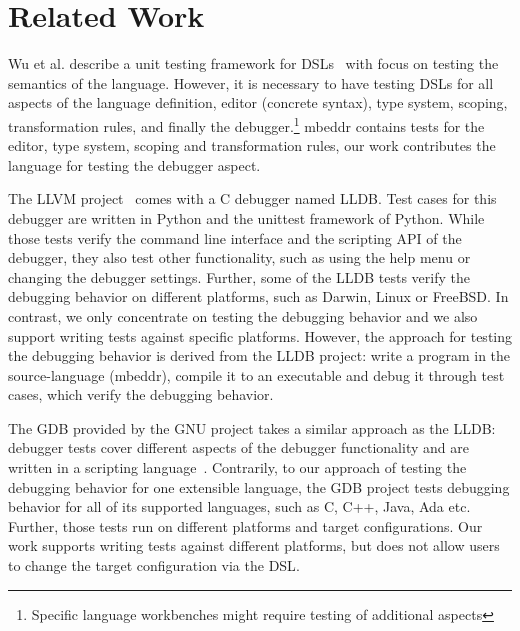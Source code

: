 \section{Related Work}

Wu et al. describe a unit testing framework for 
\acp{DSL}~\cite{DBLP:conf/dsl/WuGM09} with focus on
testing the semantics of the language.  However, it is necessary to have
testing \acp{DSL} for all aspects of the language definition, \eg editor
(concrete syntax), type system, scoping, transformation rules, and finally the
debugger.\footnote{Specific language workbenches might require testing of additional aspects}
mbeddr contains tests for the editor, type system, scoping and transformation
rules, our work contributes the language for testing the debugger aspect.

The \ac{LLVM} project~\cite{LLDB} comes with a C debugger named \ac{LLDB}.
Test cases for this debugger are written in Python
and the unittest framework of Python. While those tests verify the 
command line interface and the scripting API of the debugger, they also test
other functionality, such as using the help menu or changing the debugger settings.
Further, some of the \ac{LLDB} tests verify the debugging behavior on different
platforms, such as Darwin, Linux or FreeBSD. In contrast, we only concentrate on
testing the debugging behavior and we also support writing tests against
specific platforms. However, the approach for testing the debugging behavior is
derived from the \ac{LLDB} project: write a program in the source-language (mbeddr),
compile it to an executable and debug it through test cases, which verify the
debugging behavior.

The \ac{GDB} provided by the GNU project takes a similar approach as
the \ac{LLDB}: debugger tests cover different aspects of the debugger
functionality and are written in a scripting language~\cite{gdb}.
Contrarily, to our approach of testing the debugging behavior 
for one extensible language, the \ac{GDB} project tests
debugging behavior for all of its supported languages, such as C, C++, Java, Ada
etc. Further, those tests run on different platforms and target
configurations. Our work supports writing tests against different platforms, but
does not allow users to change the target configuration via the \ac{DSL}.
